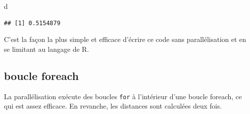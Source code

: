 \documentclass[
  12pt,
  french,
  a4paper,
  extrafontsizes,onecolumn,openright
  ]{memoir}
\newenvironment{Shaded}{\begin{snugshade}}{\end{snugshade}}
\newcommand{\AttributeTok}[1]{\textcolor[rgb]{0.13,0.29,0.53}{#1}}
\newcommand{\ControlFlowTok}[1]{\textcolor[rgb]{0.13,0.29,0.53}{\textbf{#1}}}
\newcommand{\DecValTok}[1]{\textcolor[rgb]{0.00,0.00,0.81}{#1}}
\newcommand{\FunctionTok}[1]{\textcolor[rgb]{0.13,0.29,0.53}{\textbf{#1}}}
\newcommand{\NormalTok}[1]{#1}
\newcommand{\OtherTok}[1]{\textcolor[rgb]{0.56,0.35,0.01}{#1}}
\newcommand{\SpecialCharTok}[1]{\textcolor[rgb]{0.81,0.36,0.00}{\textbf{#1}}}
\newcommand{\StringTok}[1]{\textcolor[rgb]{0.31,0.60,0.02}{#1}}
\begin{document}
\begin{Shaded}
\begin{Highlighting}[]
\NormalTok{d}
\end{Highlighting}
\end{Shaded}

\begin{verbatim}
## [1] 0.5154879
\end{verbatim}

\normalsize

C'est la façon la plus simple et efficace d'écrire ce code sans parallélisation et en se limitant au langage de R.

\subsection{boucle foreach}\label{boucle-foreach}

La parallélisation exécute des boucles \texttt{for} à l'intérieur d'une boucle foreach, ce qui est assez efficace.
En revanche, les distances sont calculées deux fois.

\scriptsize

\begin{Shaded}
\end{Shaded}
\end{document}
